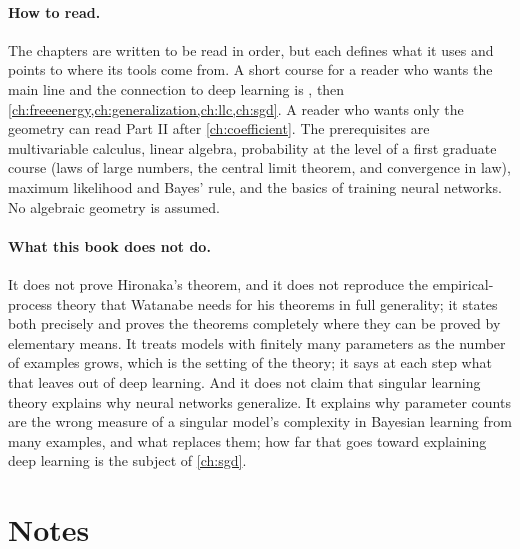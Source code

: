 \begin{refsection}
\paragraph{How to read.} The chapters are written to be read in order, but each defines what it uses and points to where its tools come from. A short course for a reader who wants the main line and the connection to deep learning is , then \cref{ch:freeenergy,ch:generalization,ch:llc,ch:sgd}. A reader who wants only the geometry can read Part II after \cref{ch:coefficient}. The prerequisites are multivariable calculus, linear algebra, probability at the level of a first graduate course (laws of large numbers, the central limit theorem, and convergence in law), maximum likelihood and Bayes' rule, and the basics of training neural networks. No algebraic geometry is assumed.

\paragraph{What this book does not do.} It does not prove Hironaka's theorem, and it does not reproduce the empirical-process theory that Watanabe needs for his theorems in full generality; it states both precisely and proves the theorems completely where they can be proved by elementary means. It treats models with finitely many parameters as the number of examples grows, which is the setting of the theory; it says at each step what that leaves out of deep learning. And it does not claim that singular learning theory explains why neural networks generalize. It explains why parameter counts are the wrong measure of a singular model's complexity in Bayesian learning from many examples, and what replaces them; how far that goes toward explaining deep learning is the subject of \cref{ch:sgd}.

\section*{Notes}


\end{refsection}
